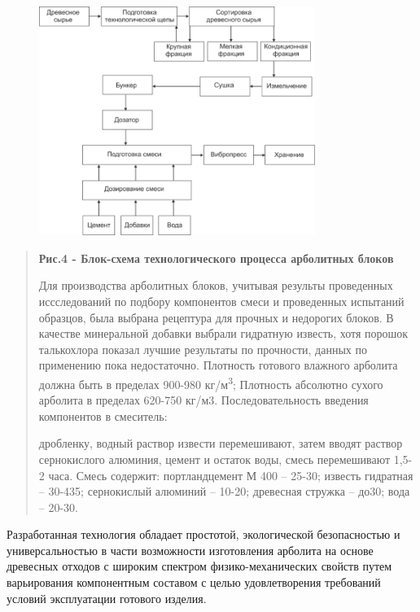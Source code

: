 \begin{figure}[H]
	\centering
	\includegraphics[width=0.8\textwidth]{media/chem2/image5}
	\caption*{}
\end{figure}


\begin{quote}
{\bfseries Рис.4 - Блок-схема технологического процесса арболитных блоков}

Для производства арболитных блоков, учитывая результы проведенных
иссследований по подбору компонентов смеси и проведенных испытаний
образцов, была выбрана рецептура для прочных и недорогих блоков. В
качестве минеральной добавки выбрали гидратную известь, хотя порошок
талькохлора показал лучшие результаты по прочности, данных по применению
пока недостаточно. Плотность готового влажного арболита должна быть в
пределах 900-980 кг/м\textsuperscript{3}; Плотность абсолютно сухого
арболита в пределах 620-750 кг/м3. Последовательность введения
компонентов в смеситель:

дробленку, водный раствор извести перемешивают, затем вводят раствор
сернокислого алюминия, цемент и остаток воды, смесь перемешивают 1,5-2
часа. Смесь содержит: портландцемент М 400 -- 25-30; известь гидратная
-- 30-435; сернокислый алюминий -- 10-20; древесная стружка -- до30;
вода -- 20-30.
\end{quote}

Разработанная технология обладает простотой, экологической безопасностью
и универсальностью в части возможности изготовления арболита на основе
древесных отходов с широким спектром физико-механических свойств путем
варьирования компонентным составом с целью удовлетворения требований
условий эксплуатации готового изделия.


